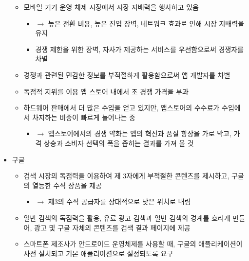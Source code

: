 \begin{itemize}
\begin{itemize}
 	\item 모바일 기기 운영 체제 시장에서 시장 지배력을 행사하고 있음
		\begin{itemize}
		\item $\rightarrow$ 높은 전환 비용, 높은 진입 장벽, 네트워크 효과로 인해 시장 지배력을 유지
		\item 경쟁 제한을 위한 장벽, 자사가 제공하는 서비스를 우선함으로써 경쟁자를 차별
		\end{itemize}
	\item 경쟁과 관련된 민감한 정보를 부적절하게 활용함으로써 앱 개발자를 차별
	\item 독점적 지위를 이용 앱 스토어 내에서 초 경쟁 가격을 부과
	\item 하드웨어 판매에서 더 많은 수입을 얻고 있지만, 앱스토어의 수수료가 수입에서 차지하는 비중이 빠르게 늘어나는 중
		\begin{itemize}
		\item $\rightarrow$ 앱스토어에서의 경쟁 약화는 앱의 혁신과 품질 향상을 가로 막고, 가격 상승과 소비자 선택의 폭을 좁히는 결과를 가져 올 것
		\end{itemize}
	\end{itemize}	
\item 구글
	\begin{itemize}
	\item 검색 시장의 독점력을 이용하여 제 3자에게 부적절한 콘텐츠를 제시하고, 구글의 열등한 수직 상품을 제공
		\begin{itemize}
		\item $\rightarrow$ 제3의 수직 공급자를 상대적으로 낮은 위치로 내림
		\end{itemize}
	\item 일반 검색의 독점력을 활용, 유료 광고 검색과 일반 검색의 경계를 흐리게 만들어, 광고 및 구글 자체의 콘텐츠를 검색 결과 페이지에 제공
	\item 스마트폰 제조사가 안드로이드 운영체제를 사용할 때, 구글의 애플리케이션이 사전 설치되고 기본 애플리이션으로 설정되도록 요구
	\end{itemize}
\end{itemize}



